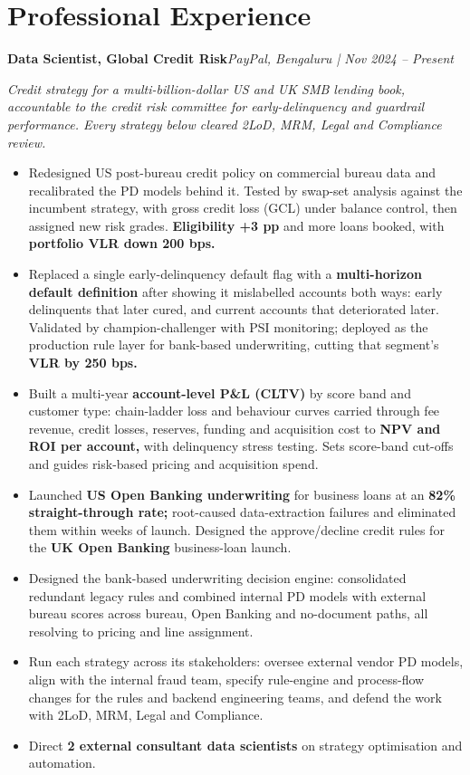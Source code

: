 \documentclass[10pt,a4paper]{article}
\newcommand{\role}[2]{\vspace{3pt}\textbf{#1}\hfill\textit{#2}\par}
\begin{document}
\section{Professional Experience}
\role{Data Scientist, Global Credit Risk}{PayPal, Bengaluru | Nov 2024 -- Present}
\textit{Credit strategy for a multi-billion-dollar US and UK SMB lending book, accountable to the credit risk committee for early-delinquency and guardrail performance. Every strategy below cleared 2LoD, MRM, Legal and Compliance review.}\par
\begin{itemize}
  \item Redesigned US post-bureau credit policy on commercial bureau data and recalibrated the PD models behind it. Tested by swap-set analysis against the incumbent strategy, with gross credit loss (GCL) under balance control, then assigned new risk grades. \textbf{Eligibility +3 pp} and more loans booked, with \textbf{portfolio VLR down 200 bps.}
  \item Replaced a single early-delinquency default flag with a \textbf{multi-horizon default definition} after showing it mislabelled accounts both ways: early delinquents that later cured, and current accounts that deteriorated later. Validated by champion-challenger with PSI monitoring; deployed as the production rule layer for bank-based underwriting, cutting that segment's \textbf{VLR by 250 bps.}
  \item Built a multi-year \textbf{account-level P\&L (CLTV)} by score band and customer type: chain-ladder loss and behaviour curves carried through fee revenue, credit losses, reserves, funding and acquisition cost to \textbf{NPV and ROI per account,} with delinquency stress testing. Sets score-band cut-offs and guides risk-based pricing and acquisition spend.
  \item Launched \textbf{US Open Banking underwriting} for business loans at an \textbf{82\% straight-through rate;} root-caused data-extraction failures and eliminated them within weeks of launch. Designed the approve/decline credit rules for the \textbf{UK Open Banking} business-loan launch.
  \item Designed the bank-based underwriting decision engine: consolidated redundant legacy rules and combined internal PD models with external bureau scores across bureau, Open Banking and no-document paths, all resolving to pricing and line assignment.
  \item Run each strategy across its stakeholders: oversee external vendor PD models, align with the internal fraud team, specify rule-engine and process-flow changes for the rules and backend engineering teams, and defend the work with 2LoD, MRM, Legal and Compliance.
  \item Direct \textbf{2 external consultant data scientists} on strategy optimisation and automation.
\end{itemize}
\end{document}
